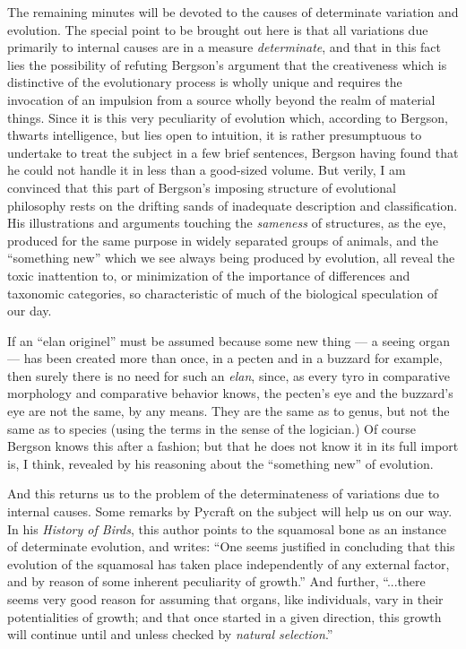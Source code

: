 \documentclass[a4paper, 11pt, oneside, polutonikogreek, english]{article}
\begin{document}
The remaining minutes will be devoted to the causes of determinate variation and evolution. The special point to be brought out here is that all variations due primarily to internal causes are in a measure \emph{determinate}, and that in this fact lies the possibility of refuting Bergson's argument that the creativeness which is distinctive of the evolutionary process is wholly unique and requires the invocation of an impulsion from a source wholly beyond the realm of material things. Since it is this very peculiarity of evolution which, according to Bergson, thwarts intelligence, but lies open to intuition, it is rather presumptuous to undertake to treat the subject in a few brief sentences, Bergson having found that he could not handle it in less than a good-sized volume. But verily, I am convinced that this part of Bergson's imposing structure of evolutional philosophy rests on the drifting sands of inadequate description and classification. His illustrations and arguments touching the \emph{sameness} of structures, as the eye, produced for the same purpose in widely separated groups of animals, and the ``something new'' which we see always being produced by evolution, all reveal the toxic inattention to, or minimization of the importance of differences and taxonomic categories, so characteristic of much of the biological speculation of our day.

If an ``elan originel'' must be assumed because some new thing --- a seeing organ --- has been created more than once, in a pecten and in a buzzard for example, then surely there is no need for such an \emph{elan}, since, as every tyro in comparative morphology and comparative behavior knows, the pecten's eye and the buzzard's eye are not the same, by any means. They are the same as to genus, but not the same as to species (using the terms in the sense of the logician.) Of course Bergson knows this after a fashion; but that he does not know it in its full import is, I think, revealed by his reasoning about the ``something new'' of evolution.

And this returns us to the problem of the determinateness of variations due to internal causes. Some remarks by Pycraft on the subject will help us on our way. In his \emph{History of Birds}, this author points to the squamosal bone as an instance of determinate evolution, and writes: ``One seems justified in concluding that this evolution of the squamosal has taken place independently of any external factor, and by reason of some inherent peculiarity of growth.'' And further, ``...there seems very good reason for assuming that organs, like individuals, vary in their potentialities of growth; and that once started in a given direction, this growth will continue until and unless checked by \emph{natural selection}.''
\end{document}
